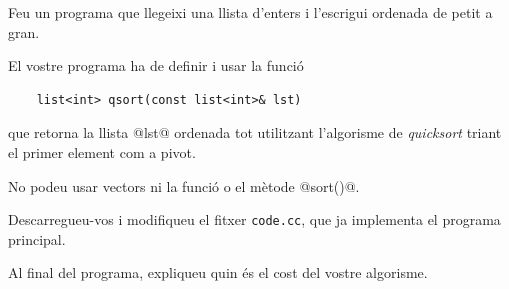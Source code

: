 
\Statement

Feu un programa que llegeixi una llista d'enters i l'escrigui ordenada de petit a gran.

\medskip

El vostre programa ha de definir i usar la funció 

\begin{lstlisting}
    list<int> qsort(const list<int>& lst)
\end{lstlisting}

que retorna la llista @lst@ ordenada tot utilitzant l'algorisme de \emph{quicksort} triant el primer element com a pivot.

\medskip

No podeu usar vectors ni la funció o el mètode @sort()@.

\medskip

Descarregueu-vos i modifiqueu el fitxer \texttt{code.cc}, que ja implementa el programa principal.

\medskip

Al final del programa, expliqueu quin és el cost del vostre algorisme.

\SampleTwoCol
